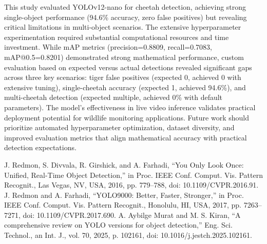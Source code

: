 \documentclass[conference]{IEEEtran}
\begin{document}
This study evaluated YOLOv12-nano for cheetah detection, achieving strong single-object performance (94.6\% accuracy, zero false positives) but revealing critical limitations in multi-object scenarios. The extensive hyperparameter experimentation required substantial computational resources and time investment. While mAP metrics (precision=0.8809, recall=0.7083, mAP@0.5=0.8201) demonstrated strong mathematical performance, custom evaluation based on expected versus actual detections revealed significant gaps across three key scenarios: tiger false positives (expected 0, achieved 0 with extensive tuning), single-cheetah accuracy (expected 1, achieved 94.6\%), and multi-cheetah detection (expected multiple, achieved 0\% with default parameters). The model's effectiveness in live video inference validates practical deployment potential for wildlife monitoring applications. Future work should prioritize automated hyperparameter optimization, dataset diversity, and improved evaluation metrics that align mathematical accuracy with practical detection expectations.

\begin{thebibliography}{00}
 J. Redmon, S. Divvala, R. Girshick, and A. Farhadi, ``You Only Look Once: Unified, Real-Time Object Detection,'' in Proc. IEEE Conf. Comput. Vis. Pattern Recognit., Las Vegas, NV, USA, 2016, pp. 779--788, doi: 10.1109/CVPR.2016.91.
 J. Redmon and A. Farhadi, ``YOLO9000: Better, Faster, Stronger,'' in Proc. IEEE Conf. Comput. Vis. Pattern Recognit., Honolulu, HI, USA, 2017, pp. 7263--7271, doi: 10.1109/CVPR.2017.690.
 A. Aybilge Murat and M. S. Kiran, ``A comprehensive review on YOLO versions for object detection,'' Eng. Sci. Technol., an Int. J., vol. 70, 2025, p. 102161, doi: 10.1016/j.jestch.2025.102161.
\end{thebibliography}
\end{document}
